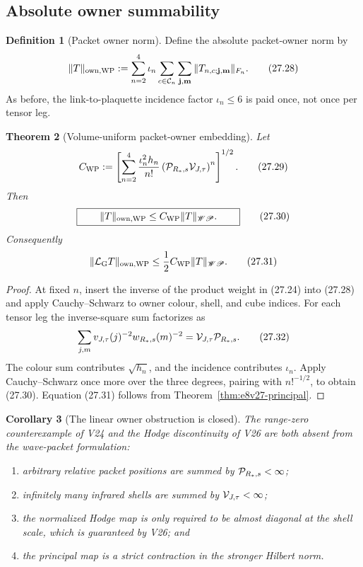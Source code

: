 \documentclass[11pt,oneside]{book}
\newtheorem{theorem}{Theorem}[chapter]
\newtheorem{corollary}[theorem]{Corollary}
\theoremstyle{definition}
\newtheorem{definition}[theorem]{Definition}
\theoremstyle{remark}
\begin{document}
\subsection{Absolute owner summability}

\begin{definition}[Packet owner norm]
\label{def:e8v27-owner-norm}
Define the absolute packet-owner norm by
\[
 \|T\|_{{\rm own},{\rm WP}}
 :=
 \sum_{n=2}^4\iota_n
 \sum_{c\in{\cal C}_n}
 \sum_{{\bf j},{\bf m}}
 \|T_{n,c;{\bf j},{\bf m}}\|_{F_n}.                              \tag{27.28}
\]
As before, the link-to-plaquette incidence factor
\(\iota_n\leq6\) is paid once, not once per tensor leg.
\end{definition}

\begin{theorem}[Volume-uniform packet-owner embedding]
\label{thm:e8v27-owner-embedding}
Let
\[
 C_{\rm WP}:=
 \left[
 \sum_{n=2}^4
 \frac{\iota_n^2h_n}{n!}
 \left({\cal P}_{R_*,s}{\cal V}_{J,\tau}\right)^n
 \right]^{1/2}.                                                   \tag{27.29}
\]
Then
\[
\boxed{\qquad
 \|T\|_{{\rm own},{\rm WP}}
 \leq C_{\rm WP}\|T\|_{\mathscr{WP}}.
\qquad}                                                           \tag{27.30}
\]
Consequently
\[
 \|\mathcal L_{\rm G}T\|_{{\rm own},{\rm WP}}
 \leq\frac12C_{\rm WP}\|T\|_{\mathscr{WP}}.                       \tag{27.31}
\]
\end{theorem}

\begin{proof}
At fixed \(n\), insert the inverse of the product weight in (27.24)
into (27.28) and apply Cauchy--Schwarz to owner colour, shell, and
cube indices.  For each tensor leg the inverse-square sum factorizes
as
\[
 \sum_{j,m}v_{J,\tau}(j)^{-2}w_{R_*,s}(m)^{-2}
 ={\cal V}_{J,\tau}{\cal P}_{R_*,s}.                              \tag{27.32}
\]
The colour sum contributes \(\sqrt{h_n}\), and the incidence
contributes \(\iota_n\).  Apply Cauchy--Schwarz once more over the
three degrees, pairing with \(n!^{-1/2}\), to obtain (27.30).
Equation (27.31) follows from
Theorem~\ref{thm:e8v27-principal}.
\end{proof}

\begin{corollary}[The linear owner obstruction is closed]
\label{cor:e8v27-linear-owner}
The range-zero counterexample of V24 and the Hodge discontinuity of
V26 are both absent from the wave-packet formulation:
\begin{enumerate}
\item arbitrary relative packet positions are summed by
\({\cal P}_{R_*,s}<\infty\);
\item infinitely many infrared shells are summed by
\({\cal V}_{J,\tau}<\infty\);
\item the normalized Hodge map is only required to be almost diagonal
at the shell scale, which is guaranteed by V26; and
\item the principal map is a strict contraction in the stronger
Hilbert norm.
\end{enumerate}
\end{corollary}
\end{document}
